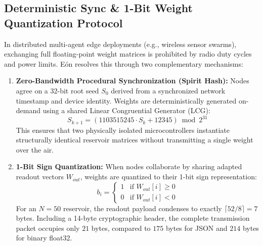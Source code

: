 \subsection{Deterministic Sync \& 1-Bit Weight Quantization Protocol}
In distributed multi-agent edge deployments (e.g., wireless sensor swarms), exchanging full floating-point weight matrices is prohibited by radio duty cycles and power limits. Eón resolves this through two complementary mechanisms:
\begin{enumerate}
    \item \textbf{Zero-Bandwidth Procedural Synchronization (Spirit Hash):} Nodes agree on a 32-bit root seed $S_0$ derived from a synchronized network timestamp and device identity. Weights are deterministically generated on-demand using a shared Linear Congruential Generator (LCG):
    \begin{equation}
        S_{k+1} = (1103515245 \cdot S_k + 12345) \bmod 2^{31}
    \end{equation}
    This ensures that two physically isolated microcontrollers instantiate structurally identical reservoir matrices without transmitting a single weight over the air.
    \item \textbf{1-Bit Sign Quantization:} When nodes collaborate by sharing adapted readout vectors $W_{out}$, weights are quantized to their 1-bit sign representation:
    \begin{equation}
        b_i = \begin{cases}
            1 & \text{if } W_{out}[i] \ge 0 \\
            0 & \text{if } W_{out}[i] < 0
        \end{cases}
    \end{equation}
    For an $N=50$ reservoir, the readout payload condenses to exactly $\lceil 52 / 8 \rceil = 7$ bytes. Including a 14-byte cryptographic header, the complete transmission packet occupies only $21$ bytes, compared to $175$ bytes for JSON and $214$ bytes for binary float32.
\end{enumerate}

